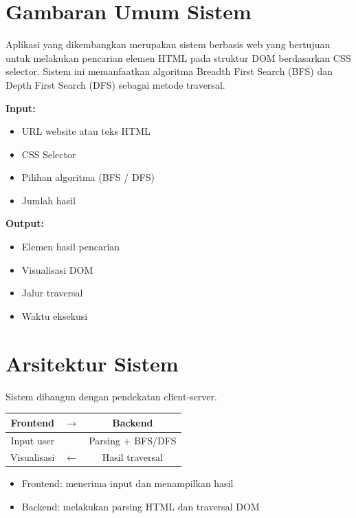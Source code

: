 \section{Gambaran Umum Sistem}

Aplikasi yang dikembangkan merupakan sistem berbasis web yang bertujuan untuk melakukan pencarian elemen HTML pada struktur DOM berdasarkan CSS selector. Sistem ini memanfaatkan algoritma Breadth First Search (BFS) dan Depth First Search (DFS) sebagai metode traversal.

\begin{tcolorbox}[colback=gray!10,title=Input dan Output Sistem]
\textbf{Input:}
\begin{itemize}
    \item URL website atau teks HTML
    \item CSS Selector
    \item Pilihan algoritma (BFS / DFS)
    \item Jumlah hasil
\end{itemize}

\textbf{Output:}
\begin{itemize}
    \item Elemen hasil pencarian
    \item Visualisasi DOM
    \item Jalur traversal
    \item Waktu eksekusi
\end{itemize}
\end{tcolorbox}


\section{Arsitektur Sistem}

Sistem dibangun dengan pendekatan client-server.

\begin{center}
\begin{tabular}{|c|c|c|}
\hline
Frontend & $\rightarrow$ & Backend \\
\hline
Input user & & Parsing + BFS/DFS \\
\hline
Visualisasi & $\leftarrow$ & Hasil traversal \\
\hline
\end{tabular}
\end{center}

\begin{itemize}
    \item Frontend: menerima input dan menampilkan hasil
    \item Backend: melakukan parsing HTML dan traversal DOM
\end{itemize}
